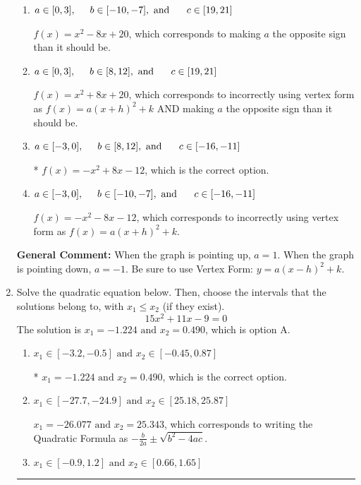\documentclass{extbook}[14pt]
\newcommand{\litem}[1]{\item #1

\rule{\textwidth}{0.4pt}}
\begin{document}
\begin{enumerate}
{\begin{enumerate}[label=\Alph*.]
$f(x)=-x^{2} -8 x -20$, which corresponds to incorrectly using vertex form as $f(x) = a(x+h)^2 - k$.
\item \( a \in [0, 3], \hspace*{5mm} b \in [-10, -7], \text{ and } \hspace*{5mm} c \in [19, 21] \)

$f(x)=x^{2} -8 x + 20$, which corresponds to making $a$ the opposite sign than it should be.
\item \( a \in [0, 3], \hspace*{5mm} b \in [8, 12], \text{ and } \hspace*{5mm} c \in [19, 21] \)

$f(x)=x^{2} +8 x + 20$, which corresponds to incorrectly using vertex form as $f(x) = a(x+h)^2+k$ AND making $a$ the opposite sign than it should be.
\item \( a \in [-3, 0], \hspace*{5mm} b \in [8, 12], \text{ and } \hspace*{5mm} c \in [-16, -11] \)

* $f(x)=-x^{2} +8 x -12$, which is the correct option.
\item \( a \in [-3, 0], \hspace*{5mm} b \in [-10, -7], \text{ and } \hspace*{5mm} c \in [-16, -11] \)

$f(x)=-x^{2} -8 x -12$, which corresponds to incorrectly using vertex form as $f(x) = a(x+h)^2+k$.
\end{enumerate}

\textbf{General Comment:} When the graph is pointing up, $a=1$. When the graph is pointing down, $a=-1$. Be sure to use Vertex Form: $y = a(x-h)^2+k$.
}
\litem{
Solve the quadratic equation below. Then, choose the intervals that the solutions belong to, with $x_1 \leq x_2$ (if they exist).
\[ 15x^{2} +11 x -9 = 0 \]The solution is \( x_1 = -1.224 \text{ and } x_2 = 0.490 \), which is option A.\begin{enumerate}[label=\Alph*.]
\item \( x_1 \in [-3.2, -0.5] \text{ and } x_2 \in [-0.45, 0.87] \)

* $x_1 = -1.224 \text{ and } x_2 = 0.490$, which is the correct option.
\item \( x_1 \in [-27.7, -24.9] \text{ and } x_2 \in [25.18, 25.87] \)

 $x_1 = -26.077 \text{ and } x_2 = 25.343$, which corresponds to writing the Quadratic Formula as $-\frac{b}{2a} \pm \sqrt{b^2 - 4ac}$.
\item \( x_1 \in [-0.9, 1.2] \text{ and } x_2 \in [0.66, 1.65] \)


\end{enumerate}}
\end{enumerate}
\end{document}
